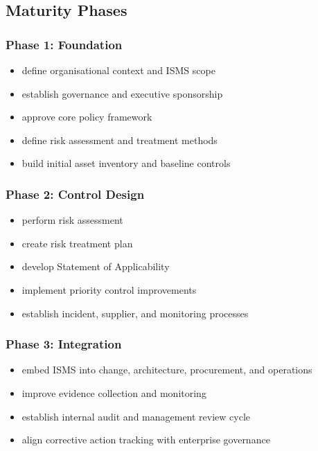\documentclass[
  letterpaper,
  DIV=11,
  numbers=noendperiod]{scrartcl}
\providecommand{\tightlist}{%
  \setlength{\itemsep}{0pt}\setlength{\parskip}{0pt}}
\begin{document}
\subsection{Maturity Phases}\label{maturity-phases}

\subsubsection{Phase 1: Foundation}\label{phase-1-foundation}

\begin{itemize}
\tightlist
\item
  define organisational context and ISMS scope
\item
  establish governance and executive sponsorship
\item
  approve core policy framework
\item
  define risk assessment and treatment methods
\item
  build initial asset inventory and baseline controls
\end{itemize}

\subsubsection{Phase 2: Control Design}\label{phase-2-control-design}

\begin{itemize}
\tightlist
\item
  perform risk assessment
\item
  create risk treatment plan
\item
  develop Statement of Applicability
\item
  implement priority control improvements
\item
  establish incident, supplier, and monitoring processes
\end{itemize}

\subsubsection{Phase 3: Integration}\label{phase-3-integration}

\begin{itemize}
\tightlist
\item
  embed ISMS into change, architecture, procurement, and operations
\item
  improve evidence collection and monitoring
\item
  establish internal audit and management review cycle
\item
  align corrective action tracking with enterprise governance
\end{itemize}
\end{document}
